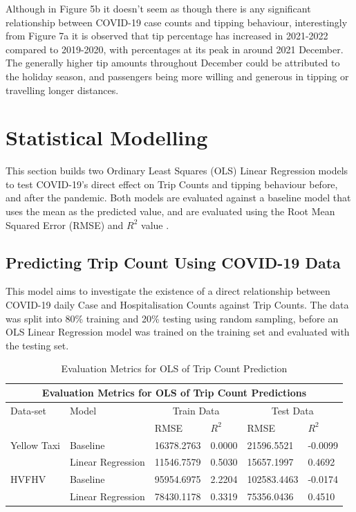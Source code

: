 \documentclass[11pt]{article}
\begin{document}
Although in Figure 5b it doesn't seem as though there is any significant relationship between COVID-19 case counts and tipping behaviour, interestingly from Figure 7a it is observed that tip percentage has increased in 2021-2022 compared to 2019-2020, with percentages at its peak in around 2021 December. The generally higher tip amounts throughout December could be attributed to the holiday season, and passengers being more willing and generous in tipping or travelling longer distances. 

\section{Statistical Modelling}
This section builds two Ordinary Least Squares (OLS) Linear Regression models to test COVID-19's direct effect on Trip Counts and tipping behaviour before, and after the pandemic. Both models are evaluated against a baseline model that uses the mean as the predicted value, and are evaluated using the Root Mean Squared Error (RMSE) \cite{rmse} and \(R^2\) value \cite{r_squared}. 

\subsection{Predicting Trip Count Using COVID-19 Data}
This model aims to investigate the existence of a direct relationship between COVID-19 daily Case and Hospitalisation Counts against Trip Counts. The data was split into 80\% training and 20\% testing using random sampling, before an OLS Linear Regression model was trained on the training set and evaluated with the testing set.

\begin{table}[H]
    \centering
    \begin{tabularx}{\linewidth}{|l|l||*{4}{X|}}
        \hline
        \multicolumn{6}{|c|}{Evaluation Metrics for OLS of Trip Count Predictions} \\
        \hline 
        Data-set & Model & \multicolumn{2}{|c|}{Train Data} & \multicolumn{2}{|c|}{Test Data}\\
        \cline{3-6}
        & & RMSE & \(R^2\) & RMSE & \(R^2\)\\
        \hline 
        Yellow Taxi & Baseline &  16378.2763 & 0.0000 & 21596.5521 & -0.0099\\
        & Linear Regression & 11546.7579 & 0.5030 & 15657.1997 & 0.4692 \\
        \hline
        HVFHV & Baseline & 95954.6975 & 2.2204 & 102583.4463 & -0.0174 \\
        & Linear Regression & 78430.1178 & 0.3319 & 75356.0436 &  0.4510 \\
        \hline
    \end{tabularx}
    \caption{Evaluation Metrics for OLS of Trip Count Prediction}
    \label{tab:my_label}
\end{table}
\end{document}
